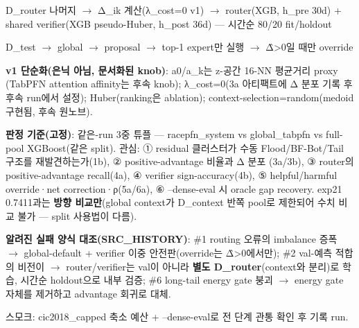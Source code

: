 \par\noindent \textbullet\enspace D\_\allowbreak{}router 나머지  \ensuremath{\rightarrow}  Δ\_\allowbreak{}ik 계산(λ\_\allowbreak{}cost=\allowbreak{}0 v1)  \ensuremath{\rightarrow}  router(XGB, h\_\allowbreak{}pre 30d) +\allowbreak{} shared verifier(XGB pseudo-Huber, h\_\allowbreak{}post 36d) — 시간순 80/\allowbreak{}20 fit/\allowbreak{}holdout


\par\noindent \textbullet\enspace D\_\allowbreak{}test  \ensuremath{\rightarrow}  global  \ensuremath{\rightarrow}  proposal  \ensuremath{\rightarrow}  top-1 expert만 실행  \ensuremath{\rightarrow}  Δ̂>0일 때만 override


\textbf{v1 단순화(은닉 아님, 문서화된 knob)}: a0/\allowbreak{}a\_\allowbreak{}k는 z-공간 16-NN 평균거리 proxy (TabPFN attention affinity는 후속 knob); λ\_\allowbreak{}cost=\allowbreak{}0(3a 아티팩트에 Δ 분포 기록 후 후속 run에서 설정); Huber(ranking은 ablation); context-selection=\allowbreak{}random(medoid 구현됨, 후속 원노브).

\textbf{판정 기준(고정)}: 같은-run 3중 튜플 — racepfn\_\allowbreak{}system vs global\_\allowbreak{}tabpfn vs full-pool XGBoost(같은 split). 관심: ① residual 클러스터가 수동 Flood/\allowbreak{}BF-Bot/\allowbreak{}Tail 구조를 재발견하는가(1b), ② positive-advantage 비율과 Δ 분포 (3a/\allowbreak{}3b), ③ router의 positive-advantage recall(4a), ④ verifier sign-accuracy(4b), ⑤ helpful/\allowbreak{}harmful override·net correction·ρ(5a/\allowbreak{}6a), ⑥ --dense-eval 시 oracle gap recovery. exp21 0.7411과는 \textbf{방향 비교만}(global context가 D\_\allowbreak{}context 반쪽 pool로 제한되어 수치 비교 불가 — split 사용법이 다름).

\textbf{알려진 실패 양식 대조(SRC\_\allowbreak{}HISTORY)}: \#1 routing 오류의 imbalance 증폭  \ensuremath{\rightarrow}  global-default +\allowbreak{} verifier 이중 안전판(override는 Δ̂>0에서만); \#2 val-예측 적합의 비전이  \ensuremath{\rightarrow}  router/\allowbreak{}verifier는 val이 아니라 \textbf{별도 D\_\allowbreak{}router}(context와 분리)로 학습, 시간순 holdout으로 내부 검증; \#6 long-tail energy gate 붕괴  \ensuremath{\rightarrow}  energy gate 자체를 제거하고 advantage 회귀로 대체.

스모크: cic2018\_\allowbreak{}capped 축소 예산 +\allowbreak{} --dense-eval로 전 단계 관통 확인 후 기록 run.

